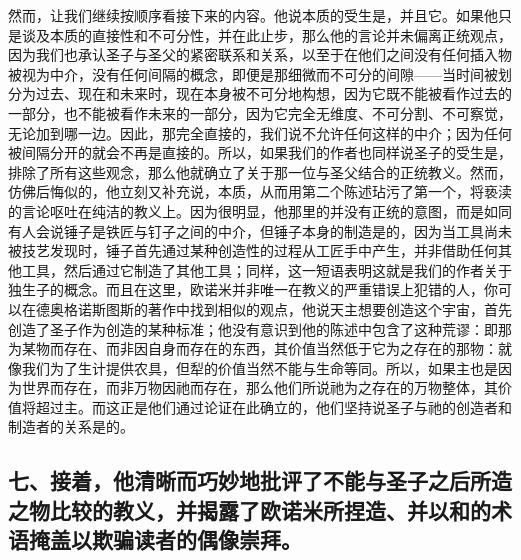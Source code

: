 然而，让我们继续按顺序看接下来的内容。他说本质的受生是，并且它。如果他只是谈及本质的直接性和不可分性，并在此止步，那么他的言论并未偏离正统观点，因为我们也承认圣子与圣父的紧密联系和关系，以至于在他们之间没有任何插入物被视为中介，没有任何间隔的概念，即便是那细微而不可分的间隙——当时间被划分为过去、现在和未来时，现在本身被不可分地构想，因为它既不能被看作过去的一部分，也不能被看作未来的一部分，因为它完全无维度、不可分割、不可察觉，无论加到哪一边。因此，那完全直接的，我们说不允许任何这样的中介；因为任何被间隔分开的就会不再是直接的。所以，如果我们的作者也同样说圣子的受生是，排除了所有这些观念，那么他就确立了关于那一位与圣父结合的正统教义。然而，仿佛后悔似的，他立刻又补充说，本质，从而用第二个陈述玷污了第一个，将亵渎的言论呕吐在纯洁的教义上。因为很明显，他那里的并没有正统的意图，而是如同有人会说锤子是铁匠与钉子之间的中介，但锤子本身的制造是的，因为当工具尚未被技艺发现时，锤子首先通过某种创造性的过程从工匠手中产生，并非借助任何其他工具，然后通过它制造了其他工具；同样，这一短语表明这就是我们的作者关于独生子的概念。而且在这里，欧诺米并非唯一在教义的严重错误上犯错的人，你可以在德奥格诺斯图斯的著作中找到相似的观点，他说天主想要创造这个宇宙，首先创造了圣子作为创造的某种标准；他没有意识到他的陈述中包含了这种荒谬：即那为某物而存在、而非因自身而存在的东西，其价值当然低于它为之存在的那物：就像我们为了生计提供农具，但犁的价值当然不能与生命等同。所以，如果主也是因为世界而存在，而非万物因祂而存在，那么他们所说祂为之存在的万物整体，其价值将超过主。而这正是他们通过论证在此确立的，他们坚持说圣子与祂的创造者和制造者的关系是的。\par


\subsection{七、接着，他清晰而巧妙地批评了不能与圣子之后所造之物比较的教义，并揭露了欧诺米所捏造、并以和的术语掩盖以欺骗读者的偶像崇拜。}

